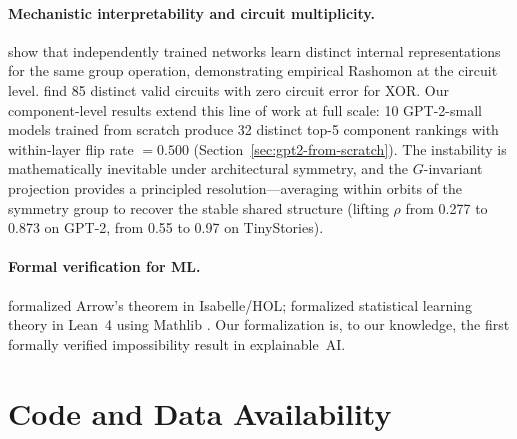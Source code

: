 \documentclass{article}
\begin{document}
\paragraph{Mechanistic interpretability and circuit multiplicity.}
\citet{chughtai2023toy} show that independently trained networks learn distinct internal representations for the same group operation, demonstrating empirical Rashomon at the circuit level. \citet{meloux2025circuits} find 85 distinct valid circuits with zero circuit error for XOR. Our component-level results extend this line of work at full scale: 10 GPT-2-small models trained from scratch produce 32 distinct top-5 component rankings with within-layer flip rate $= 0.500$ (Section~\ref{sec:gpt2-from-scratch}). The instability is mathematically inevitable under architectural symmetry, and the $G$-invariant projection provides a principled resolution---averaging within orbits of the symmetry group to recover the stable shared structure (lifting $\rho$ from 0.277 to 0.873 on GPT-2, from 0.55 to 0.97 on TinyStories).

\paragraph{Formal verification for ML.}
\begin{sloppypar}
\citet{nipkow2009social} formalized Arrow's theorem in Isabelle/HOL; \citet{zhang2026statistical} formalized statistical learning theory in Lean~4 \citep{demoura2021lean4} using Mathlib \citep{mathlib2020}. Our formalization is, to our knowledge, the first formally verified impossibility result in explainable~AI.
\end{sloppypar}

\endgroup%

\section{Code and Data Availability}
\label{sec:code-availability}
\end{document}
